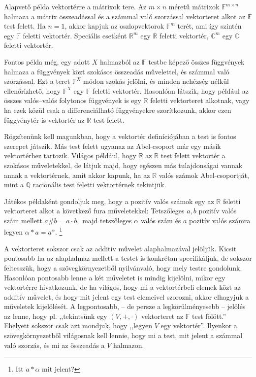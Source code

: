 \documentclass[a4paper, showtrims]{memoir}
\theoremstyle{plain}
\theoremstyle{remark}
\theoremstyle{definition}
\begin{document}
Alapvető példa vektortérre a mátrixok tere.
Az $m\times n$ méretű mátrixok $\mathbb{F}^{m\times n}$ halmaza a mátrix összeadással és a számmal való szorzással
vektorteret alkot az $\mathbb{F}$ test felett.
Ha $n=1$, akkor kapjuk az oszlopvektorok $\mathbb{F}^m$ terét, ami így szintén egy $\mathbb{F}$ feletti vektortér.
Speciális esetként $\mathbb{R}^m$ egy $\mathbb{R}$ feletti vektortér,
$\mathbb{C}^m$ egy $\mathbb{C}$ feletti vektortér.

Fontos példa még, egy adott $X$ halmazból az $\mathbb{F}$ testbe képező összes függvények halmaza
a függvények közt szokásos összeadás művelettel, és számmal való szorzással.
Ezt a teret $\mathbb{F}^X$ módon szokás jelölni, és minden nehézség nélkül ellenőrizhető,
hogy $\mathbb{F}^X$ egy $\mathbb{F}$ feletti vektortér.
Hasonlóan látszik, hogy például az összes valós--valós folytonos függvények is egy $\mathbb{R}$
feletti vektorteret alkotnak, vagy ha ezek közül csak a differenciálható függvényekre szorítkozunk,
akkor ezen függvénytér is vektortér az $\mathbb{R}$ test felett.

Rögzítenünk kell magunkban, hogy a vektortér definíciójában a test is fontos szerepet játszik.
Más test felett ugyanaz az Abel-csoport már egy másik vektortérhez tartozik.
Világos például, hogy $\mathbb{R}$ az $\mathbb{R}$ test felett vektortér a szokásos műveletekkel,
de látjuk majd, hogy egészen más tulajdonságai vannak annak a vektortérnek,
amit akkor kapunk,
ha az $\mathbb{R}$ valós számok Abel-csoportját,
mint a $\mathbb{Q}$ racionális test feletti vektortérnek tekintjük.

Játékos példaként gondoljuk meg,
hogy a pozitív valós számok egy az $\mathbb{R}$ feletti vektorteret alkot a következő fura műveletekkel:
Tetszőleges $a,b$ pozitív valós szám mellett
\(
a\#b=a\cdot b,
\)
majd tetszőleges $\alpha$ valós szám és $a$ pozitív valós számra legyen
\(
\alpha\ast a=a^\alpha.
\)
\footnote{Itt $a\ast\alpha$ mit jelent?}

A vektorteret sokszor csak az additív művelet alaphalmazával jelöljük.
Kicsit pontosabb ha az alaphalmaz mellett a testet is konkrétan specifikáljuk,
de sokszor feltesszük, hogy a szövegkörnyezetből nyilvánvaló, hogy mely testre gondolunk.
Hasonlóan pontosabb lenne a két műveletet is mindig kijelölni, mikor egy vektortérre hivatkozunk,
de ha világos, hogy mi a vektortérbeli elemek közt az additív művelet, és hogy mit jelent egy test elemeivel szorozni,
akkor elhagyjuk a műveletek kijelölését.
A legpontosabb, -- de persze a legkörülményesebb -- jelölés az lenne, hogy pl.
,,tekintsünk egy $\left( V,+,\cdot \right)$ vektorteret az $\mathbb{F}$ test fölött.''
Ehelyett sokszor csak azt mondjuk, hogy
,,legyen $V$ egy vektortér''.
Ilyenkor a szövegkörnyezetből világosnak kell lennie, hogy mi a test, mit jelent a számmal való szorzás, és mi az összeadás a $V$ halmazon.
\end{document}
